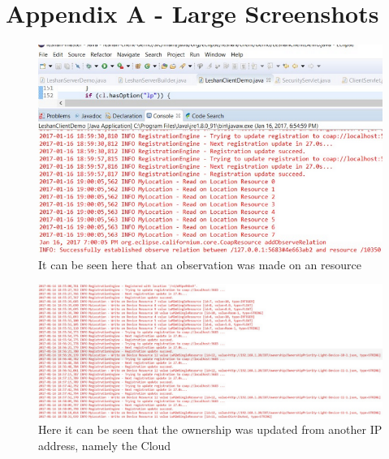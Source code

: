 \documentclass[11pt]{article}
\begin{document}






\pagebreak

\section{Appendix A - Large Screenshots}

\begin{figure}[h]
	\begin{center}
		\includegraphics[width=\linewidth]{img/screenshot-observe}
		\caption{It can be seen here that an observation was made on an resource}
		\label{fig:observe}
	\end{center}
\end{figure}

\begin{figure}[h!]
	\begin{center}
		\includegraphics[width=1.18\linewidth]{img/screenshot-ownership}
		\caption{Here it can be seen that the ownership was updated from another IP address, namely the Cloud}
		\label{fig:own}
	\end{center}
\end{figure}
\end{document}
